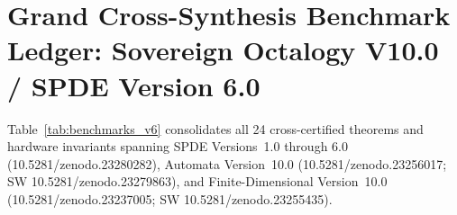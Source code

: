 \documentclass[11pt,a4paper,reqno]{article}
\def\texttt#1{#1}%
\def\zenodo#1{10.5281/zenodo.#1}%
\newcommand{\zenodo}[1]{\href{https://doi.org/10.5281/zenodo.#1}{\texttt{10.5281/\allowbreak zenodo.#1}}}
\theoremstyle{plain}
\theoremstyle{definition}
\theoremstyle{remark}
\numberwithin{equation}{section}
\begin{document}
\section{Grand Cross-Synthesis Benchmark Ledger: Sovereign Octalogy V10.0 / SPDE Version 6.0}
\label{sec:benchmark_ledger_v6}

Table~\ref{tab:benchmarks_v6} consolidates all 24 cross-certified theorems and hardware invariants spanning SPDE Versions~1.0 through 6.0 (\zenodo{23280282}), Automata Version~10.0 (\zenodo{23256017}; SW \zenodo{23279863}), and Finite-Dimensional Version~10.0 (\zenodo{23237005}; SW \zenodo{23255435}).
\end{document}
